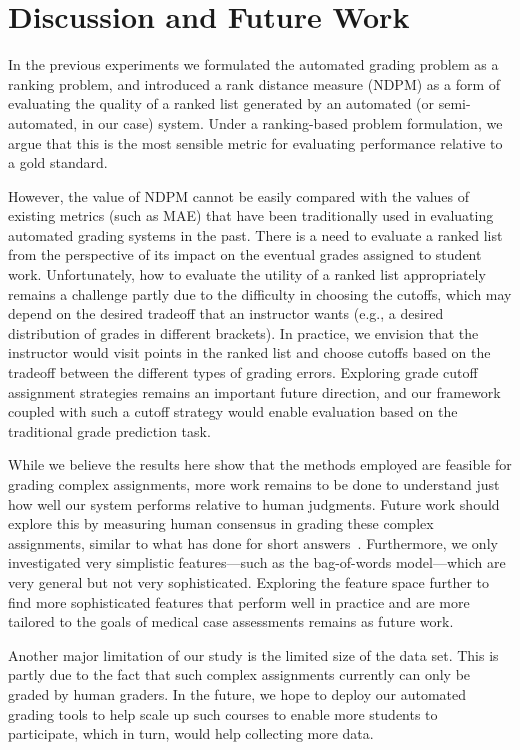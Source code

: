 \section{Discussion and Future Work}

In the previous experiments we formulated the automated grading problem as
a ranking problem, and introduced a rank distance measure (NDPM) as a form
of evaluating the quality of a ranked list generated by an automated (or
semi-automated, in our case) system. Under a ranking-based problem
formulation, we argue that this is the most sensible metric for evaluating
performance relative to a gold standard.

However, the value of NDPM cannot be easily compared with the values of
existing metrics (such as MAE) that have been traditionally used in
evaluating automated grading systems in the past. There is a need to
evaluate a ranked list from the perspective of its impact on the eventual
grades assigned to student work. Unfortunately, how to evaluate the utility
of a ranked list appropriately remains a challenge partly due to the
difficulty in choosing the cutoffs, which may depend on the desired
tradeoff that an instructor wants (e.g., a desired distribution of grades
in different brackets). In practice, we envision that the instructor would
visit points in the ranked list and choose cutoffs based on the tradeoff
between the different types of grading errors. Exploring grade cutoff
assignment strategies remains an important future direction, and our
framework coupled with such a cutoff strategy would enable evaluation based
on the traditional grade prediction task.

While we believe the results here show that the methods employed are
feasible for grading complex assignments, more work remains to be done to
understand just how well our system performs relative to human judgments.
Future work should explore this by measuring human consensus in grading
these complex assignments, similar to what has done for short
answers~\cite{Mohler:2009:EACL}. Furthermore, we only investigated very
simplistic features---such as the bag-of-words model---which are very
general but not very sophisticated. Exploring the feature space further to
find more sophisticated features that perform well in practice and are more
tailored to the goals of medical case assessments remains as future work.

Another major limitation of our study is the limited size of the data set.
This is partly due to the fact that such complex assignments currently can
only be graded by human graders. In the future, we hope to deploy our
automated grading tools to help scale up such courses to enable more
students to participate, which in turn, would help collecting more data.

